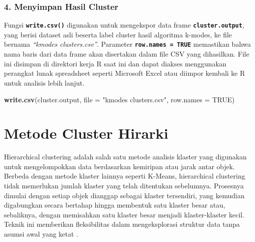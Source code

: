 \documentclass[
  oneside]{book}
\newenvironment{Shaded}{\begin{snugshade}}{\end{snugshade}}
\newcommand{\AttributeTok}[1]{\textcolor[rgb]{0.13,0.29,0.53}{#1}}
\newcommand{\ConstantTok}[1]{\textcolor[rgb]{0.56,0.35,0.01}{#1}}
\newcommand{\DecValTok}[1]{\textcolor[rgb]{0.00,0.00,0.81}{#1}}
\newcommand{\FunctionTok}[1]{\textcolor[rgb]{0.13,0.29,0.53}{\textbf{#1}}}
\newcommand{\NormalTok}[1]{#1}
\newcommand{\OtherTok}[1]{\textcolor[rgb]{0.56,0.35,0.01}{#1}}
\newcommand{\SpecialCharTok}[1]{\textcolor[rgb]{0.81,0.36,0.00}{\textbf{#1}}}
\newcommand{\StringTok}[1]{\textcolor[rgb]{0.31,0.60,0.02}{#1}}
\begin{document}
\begin{Shaded}
\end{Shaded}

\subsection*{4. Menyimpan Hasil Cluster}\label{menyimpan-hasil-cluster}

Fungsi \textbf{\texttt{write.csv()}} digunakan untuk mengekspor data frame \textbf{\texttt{cluster.output}}, yang berisi dataset asli beserta label cluster hasil algoritma k-modes, ke file bernama \emph{``kmodes clusters.csv''}. Parameter \textbf{\texttt{row.names\ =\ TRUE}} memastikan bahwa nama baris dari data frame akan disertakan dalam file CSV yang dihasilkan. File ini disimpan di direktori kerja R saat ini dan dapat diakses menggunakan perangkat lunak spreadsheet seperti Microsoft Excel atau diimpor kembali ke R untuk analisis lebih lanjut.

\begin{Shaded}
\begin{Highlighting}[]
\FunctionTok{write.csv}\NormalTok{(cluster.output, }\AttributeTok{file =} \StringTok{"kmodes clusters.csv"}\NormalTok{, }\AttributeTok{row.names =} \ConstantTok{TRUE}\NormalTok{)}
\end{Highlighting}
\end{Shaded}

\chapter{Metode Cluster Hirarki}\label{HC}

Hierarchical clustering adalah salah satu metode analisis klaster yang digunakan untuk mengelompokkan data berdasarkan kemiripan atau jarak antar objek. Berbeda dengan metode klaster lainnya seperti K-Means, hierarchical clustering tidak memerlukan jumlah klaster yang telah ditentukan sebelumnya. Prosesnya dimulai dengan setiap objek dianggap sebagai klaster tersendiri, yang kemudian digabungkan secara bertahap hingga membentuk satu klaster besar atau, sebaliknya, dengan memisahkan satu klaster besar menjadi klaster-klaster kecil. Teknik ini memberikan fleksibilitas dalam mengeksplorasi struktur data tanpa asumsi awal yang ketat \citep{everitt2011cluster} .
\end{document}
